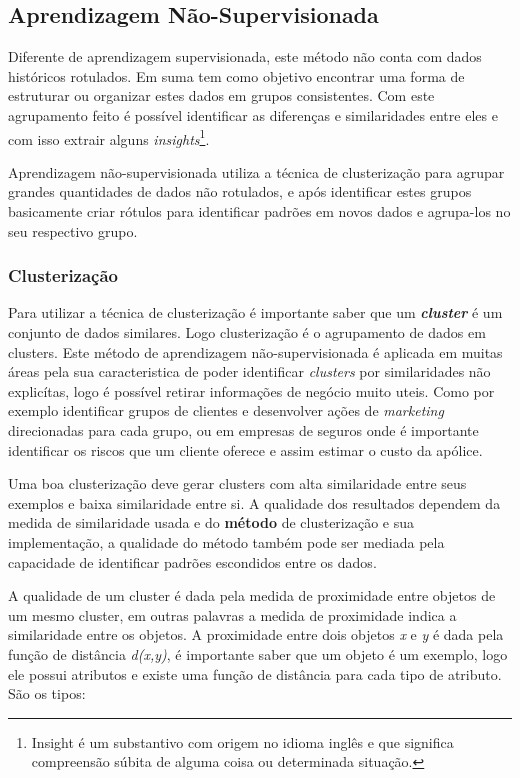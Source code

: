 \subsection{Aprendizagem Não-Supervisionada}
\label{subsec:unsupervised-learning}

Diferente de aprendizagem supervisionada, este método não conta com dados históricos rotulados. Em suma tem como objetivo encontrar
uma forma de estruturar ou organizar estes dados em grupos consistentes. Com este agrupamento feito é possível identificar 
as diferenças e similaridades entre eles e com isso extrair alguns 
\textit{insights}\footnote{ \cite{insight} Insight é um substantivo com origem no idioma inglês e que significa 
compreensão súbita de alguma coisa ou determinada situação.}.

Aprendizagem não-supervisionada utiliza a técnica de clusterização para agrupar grandes quantidades de dados não rotulados,
e após identificar estes grupos basicamente criar rótulos para identificar padrões em novos dados e agrupa-los no seu respectivo
grupo.

\subsubsection{Clusterização}
\label{subsec:clustering}
Para utilizar a técnica de clusterização é importante saber que um \textbf{\textit{cluster}} é um conjunto de dados similares.
Logo clusterização é o agrupamento de dados em clusters. Este método de aprendizagem não-supervisionada é aplicada em muitas áreas
pela sua caracteristica de poder identificar \textit{clusters} por similaridades não explicítas, logo é possível retirar informações
de negócio muito uteis. Como por exemplo identificar grupos de clientes e desenvolver ações de \textit{marketing} direcionadas
para cada grupo, ou em empresas de seguros onde é importante identificar os riscos que um cliente oferece e assim estimar o
custo da apólice.

Uma boa clusterização deve gerar clusters com alta similaridade entre seus exemplos e baixa similaridade entre si. A qualidade 
dos resultados dependem da medida de similaridade usada e do \textbf{método} de clusterização e sua implementação,
a qualidade do método também pode ser mediada pela capacidade de identificar padrões escondidos entre os dados.

A qualidade de um cluster é dada pela medida de proximidade entre objetos de um mesmo cluster, em outras palavras a medida de 
proximidade indica a similaridade entre os objetos. A proximidade entre dois objetos \textit{x} e \textit{y} é dada pela função
de distância \textit{d(x,y)}, é importante saber que um objeto é um exemplo, logo ele possui atributos e existe uma função de 
distância para cada tipo de atributo. São os tipos:

